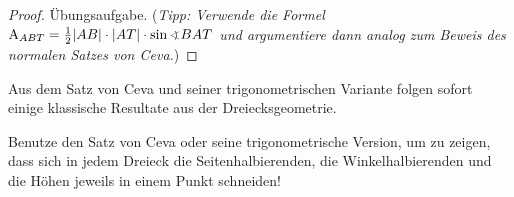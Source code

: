 \begin{proof}
	Übungsaufgabe. (\emph{Tipp: Verwende die Formel $\mathrm{A}_{ABT}=\frac12\abs{AB}\cdot \abs{AT}\cdot \sin\winkel BAT$ und argumentiere dann analog zum Beweis des normalen Satzes von Ceva.})
\end{proof}

Aus dem Satz von Ceva und seiner trigonometrischen Variante folgen sofort einige klassische Resultate aus der Dreiecksgeometrie.

\begin{aufgabe*}
	Benutze den Satz von Ceva oder seine trigonometrische Version, um zu zeigen, dass sich in jedem Dreieck die Seitenhalbierenden, die Winkelhalbierenden und die Höhen jeweils in einem Punkt schneiden!
\end{aufgabe*}

